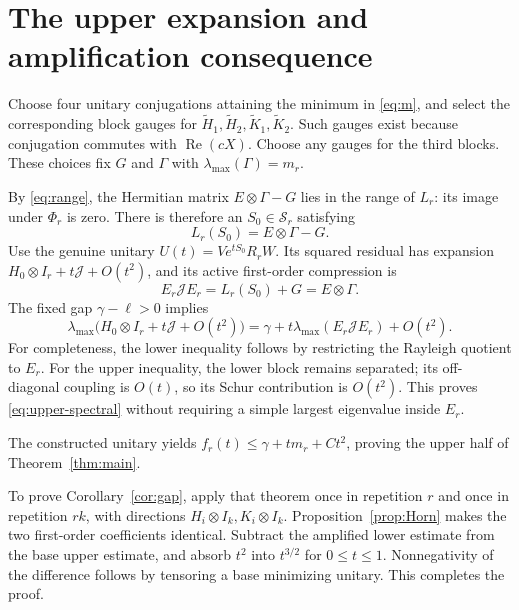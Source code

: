 \documentclass[11pt]{article}
\theoremstyle{remark}\newtheorem{remark}[theorem]{Remark}
\newcommand{\Ree}{\operatorname{Re}}
\newcommand{\trans}{\mathcal S}
\begin{document}
\section{The upper expansion and amplification consequence}
Choose four unitary conjugations attaining the minimum in \eqref{eq:m}, and select the corresponding block gauges for $\widetilde H_1,\widetilde H_2,\widetilde K_1,\widetilde K_2$. Such gauges exist because conjugation commutes with $\Ree(cX)$. Choose any gauges for the third blocks. These choices fix $G$ and $\Gamma$ with $\lambda_{\max}(\Gamma)=m_r$.

By \eqref{eq:range}, the Hermitian matrix $E\otimes\Gamma-G$ lies in the range of $L_r$: its image under $\Phi_r$ is zero. There is therefore an $S_0\in\trans_r$ satisfying
\begin{equation}\label{eq:upper-correction}
 L_r(S_0)=E\otimes\Gamma-G.
\end{equation}
Use the genuine unitary $U(t)=Ve^{tS_0}R_rW$. Its squared residual has expansion $H_0\otimes I_r+t\mathcal J+O(t^2)$, and its active first-order compression is
\[
 E_r\mathcal J E_r=L_r(S_0)+G=E\otimes\Gamma.
\]
The fixed gap $\gamma-\ell>0$ implies
\begin{equation}\label{eq:upper-spectral}
 \lambda_{\max}\bigl(H_0\otimes I_r+t\mathcal J+O(t^2)\bigr)
 =\gamma+t\lambda_{\max}(E_r\mathcal J E_r)+O(t^2).
\end{equation}
For completeness, the lower inequality follows by restricting the Rayleigh quotient to $E_r$. For the upper inequality, the lower block remains separated; its off-diagonal coupling is $O(t)$, so its Schur contribution is $O(t^2)$. This proves \eqref{eq:upper-spectral} without requiring a simple largest eigenvalue inside $E_r$.

The constructed unitary yields $f_r(t)\le\gamma+tm_r+Ct^2$, proving the upper half of Theorem~\ref{thm:main}.

To prove Corollary~\ref{cor:gap}, apply that theorem once in repetition $r$ and once in repetition $rk$, with directions $H_i\otimes I_k,K_i\otimes I_k$. Proposition~\ref{prop:Horn} makes the two first-order coefficients identical. Subtract the amplified lower estimate from the base upper estimate, and absorb $t^2$ into $t^{3/2}$ for $0\le t\le1$. Nonnegativity of the difference follows by tensoring a base minimizing unitary. This completes the proof.
\end{document}
